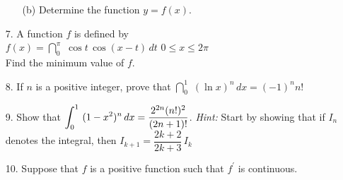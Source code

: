 \documentclass{sebase}
\begin{document}
\begin{enumerate}
\begin{enumerate}
\item[(b)] Determine the function $y=f(x)$.

%
\end{enumerate}

\item[7.] A function $f$ is defined by \\[4pt]
\hspace*{\fill}$f(x)=\dint\nolimits_{0}^{\pi }\,\,\cos t\,\cos (x-t)\,dt$%
\qquad $0\leq x\leq 2\pi $\hspace*{\fill}\\[4pt]
Find the minimum value of $f$.

%

%

\item[8.] If $n$ is a positive integer, prove that $\dint\nolimits_{0}^{1}\,%
\,(\ln x)^{n}\,dx=(-1)^{n}n!$

%

\item[9.] Show that $\dint\nolimits_{0}^{1}\,\,(1-x^{2})^{n}\,dx=\dfrac{%
2^{2n}(n!)^{2}}{(2n+1)!}$.\newline
\textit{Hint:} Start by showing that if $I_{n}$ denotes the integral, then $%
I_{k+1}=\dfrac{2k+2}{2k+3}\,I_{k}$

%

%

\item[10.] 
\GCALCXpp%
Suppose that $f$ is a positive function such that $f^{\prime }$ is
continuous.


\end{enumerate}
\end{document}
